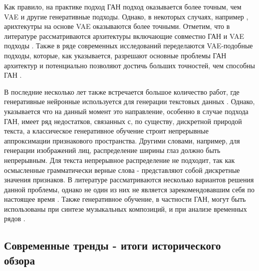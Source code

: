 \documentclass[12pt]{article}
\begin{document}
\begin{sloppypar}
Как правило, на практике подход ГАН подход оказывается более точным, чем VAE и другие генеративные подходы. Однако, в некоторых случаях, например \cite{vahdat2021score}, арихтекутры на основе VAE оказываются более точными. Отметим, что в литературе рассматриваются архитектуры включающие совместно  ГАН и VAE подходы \cite{larsen2016autoencoding}. Также в ряде современных исследований переделаются  VAE-подобные подходы, которые, как указывается, разрешают основные проблемы ГАН архитектур и потенциально позволяют достичь больших точностей, чем способны ГАН \cite{dhariwal2021diffusion}. 

В последние несколько лет также встречается большое количество работ, где генеративные нейронные используется для генерации текстовых данных \cite{iqbal2020survey}. Однако, указывается что на данный момент это направление, особенно в случае подхода ГАН,  имеет ряд недостатков, связанных с, по существу, дискретной природой текста, а классическое генеративное обучение строит непрерывные аппроксимации признакового пространства. Другими словами, например, для генерации изображений лиц, распределение ширины глаз должно быть непрерывным. Для текста непрерывное распределение не подходит, так как осмысленные грамматически верные слова - представляют собой дискретные значения признаков. В литературе рассматриваются несколько вариантов решения данной проблемы, однако не один из них не является зарекомендовавшим себя по настоящее время \cite{hossam2021text, iqbal2020survey}. Также генеративное обучение, в частности ГАН, могут быть использованы при синтезе музыкальных композиций,   \cite{kulkarni2019survey} и при анализе временных рядов \cite{hartmann2018eeg}.

\newpage
\subsection{Современные тренды - итоги исторического обзора}


\end{sloppypar}
\end{document}
